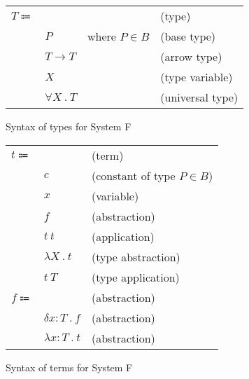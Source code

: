 \documentclass[acmlarge]{acmart}
\begin{document}
  \newcommand\labs[2]{\lambda #1 \ . \ #2}
  \newcommand\dabs[2]{\delta #1 \ . \ #2}
  \newcommand\lapp[2]{#1 \ #2}
  \newcommand\lsub[3]{#1 \left[ #2 \mapsto #3 \right]}

  \newcommand\evalsto[2]{#1 \longrightarrow #2}

  \newcommand\tarrow[2]{#1 \rightarrow #2}
  \newcommand\tforall[2]{\forall #1 \ . \ #2}

  \begin{figure}[h!]
    \begin{mdframed}

      \begin{tabular}{l l l l}
        $T \Coloneqq $ & & & (type) \\
        & $P$ & where $P \in B$ & (base type) \\
        & $T \rightarrow T$ & & (arrow type) \\
        & $X$ & & (type variable) \\
        & $\tforall{X}{T}$ & & (universal type) \\
      \end{tabular}

    \end{mdframed}
    \caption{Syntax of types for System F}
    \label{fig:system_f_types_syntax}
  \end{figure}

  \begin{figure}[h!]
    \begin{mdframed}

      \begin{tabular}{l l l}
        $t \Coloneqq $ & & (term) \\
        & $c$ & (constant of type $P \in B$) \\
        & $x$ & (variable) \\
        & $f$ & (abstraction) \\
        & $\lapp{t}{t}$ & (application) \\
        & $\labs{X}{t}$ & (type abstraction) \\
        & $\lapp{t}{T}$ & (type application) \\
        $f \Coloneqq $ & & (abstraction) \\
        & $\dabs{x : T}{f}$ & (abstraction) \\
        & $\labs{x : T}{t}$ & (abstraction)
      \end{tabular}

    \end{mdframed}
    \caption{Syntax of terms for System F}
    \label{fig:system_f_terms_syntax}
  \end{figure}
\end{document}
